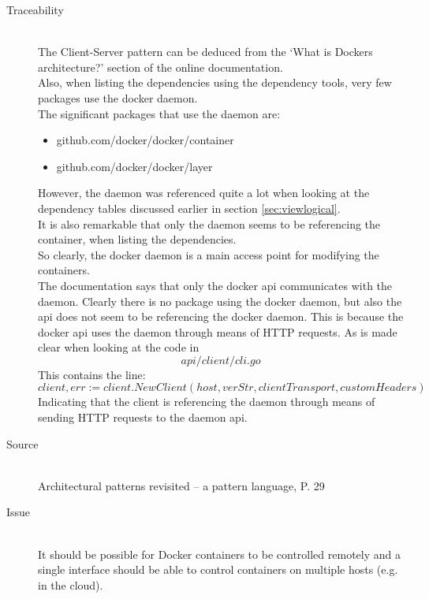 \begin{description}
\item [Traceability]~\\
The Client-Server pattern can be deduced from the `What is Dockers architecture?' section of the online documentation\cite{dockerarchi}.\\
Also, when listing the dependencies using the dependency tools, very few packages use the docker daemon. \\
The significant packages that use the daemon are:
\begin{itemize}
	\item github.com/docker/docker/container
	\item github.com/docker/docker/layer
\end{itemize}

However, the daemon was referenced quite a lot when looking at the dependency tables discussed earlier in section \ref{sec:viewlogical}.\\
It is also remarkable that only the daemon seems to be referencing the container, when listing the dependencies.\\
So clearly, the docker daemon is a main access point for modifying the containers.\\
The documentation says that only the docker api communicates with the daemon. Clearly there is no package using the docker daemon, but also the api does not seem to be referencing the docker daemon. This is because the docker api uses the daemon through means of HTTP requests. As is made clear when looking at the code in $$api/client/cli.go$$
This contains the line: $$client, err := client.NewClient(host, verStr, clientTransport, customHeaders)$$
Indicating that the client is referencing the daemon through means of sending HTTP requests to the daemon api.


\item [Source]~\\
Architectural patterns revisited -- a pattern language, P. 29 \cite{avgeriou2005architectural}

\item [Issue]~\\
It should be possible for Docker containers to be controlled remotely and a single interface should be able to control containers on multiple hosts (e.g. in the cloud).


\end{description}
